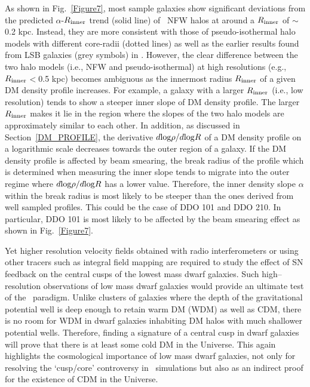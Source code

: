 \documentclass[natbib209]{emulateapj}
\begin{document}
As shown in Fig.~\ref{Figure7}, most sample galaxies show significant deviations from the
predicted $\alpha$\--$R_{\rm inner}$ trend (solid line) of \LCDM\ NFW halos
at around a $R_{\rm inner}$ of $\sim$0.2 kpc. Instead, they are
more consistent with those of pseudo-isothermal halo models with different
core-radii (dotted lines) as well as the earlier results found from LSB galaxies
(grey symbols) in \cite{deBlok_2002}. However, the clear difference between the
two halo models (i.e., NFW and pseudo-isothermal) at high
resolutions (e.g., $R_{\rm inner}$$<$0.5 kpc) becomes ambiguous as the innermost radius
$R_{\rm inner}$ of a given DM density profile increases. 
For example, a galaxy with a larger $R_{\rm inner}$ (i.e., low resolution) tends
to show a steeper inner slope of DM density profile.
The larger $R_{\rm inner}$ makes it lie in the region where the slopes of the two halo models are
approximately similar to each other. 
In addition, as discussed in Section~\ref{DM_PROFILE},
the derivative $d{\rm log}\rho/d{\rm log}R$ of a DM density profile on a logarithmic scale decreases towards the
outer region of a galaxy. If the DM density profile is affected by beam
smearing, the break radius of the profile which is determined when
measuring the inner slope tends to migrate into the outer regime where
$d{\rm log}\rho/d{\rm log}R$ has a lower value. Therefore, the inner density slope $\alpha$ within the
break radius is most likely to be steeper than the ones derived from well
sampled profiles. This could be the case of DDO 101 and DDO 210. In particular,
DDO 101 is most likely to be affected by the beam smearing effect as shown in
Fig.~\ref{Figure7}.

Yet higher resolution velocity fields obtained with radio
interferometers or using other tracers such as integral field mapping are 
required to study the effect of SN feedback on the central
cusps of the lowest mass dwarf galaxies. Such high--resolution observations of
low mass dwarf galaxies would provide an ultimate test of the \LCDM\ paradigm. Unlike clusters of galaxies
where the depth of the gravitational potential well is deep enough to retain warm DM (WDM)
as well as CDM, there is no room for WDM in dwarf galaxies inhabiting DM halos
with much shallower potential wells. Therefore, finding a signature of a central
cusp in dwarf galaxies will prove that there is at least some cold DM in the
Universe. This again highlights the cosmological importance of low mass dwarf
galaxies, not only for resolving the `cusp/core' controversy in \LCDM\
simulations but also as an indirect proof for the existence of CDM in the Universe. 
\end{document}

